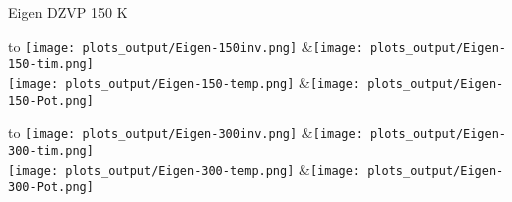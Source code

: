 \documentclass[a4paper,10pt]{report}
\begin{document}
\newpage
\pagebreak
\begin{table}[ht]
\caption{Eigen DZVP 150 K}
\centering
\begin{tabu}to \textwidth {X[c]X[c]}
 \texttt{[image: plots\_output/Eigen-150inv.png]} &\texttt{[image: plots\_output/Eigen-150-tim.png]}  \\
 \texttt{[image: plots\_output/Eigen-150-temp.png]} &\texttt{[image: plots\_output/Eigen-150-Pot.png]} \\
\end{tabu}



\caption{Eigen DZVP 300 K}
\centering
\begin{tabu}to \textwidth {X[c]X[c]}
 \texttt{[image: plots\_output/Eigen-300inv.png]} &\texttt{[image: plots\_output/Eigen-300-tim.png]}  \\
 \texttt{[image: plots\_output/Eigen-300-temp.png]} &\texttt{[image: plots\_output/Eigen-300-Pot.png]} \\
\end{tabu}
\end{table}
\end{document}
